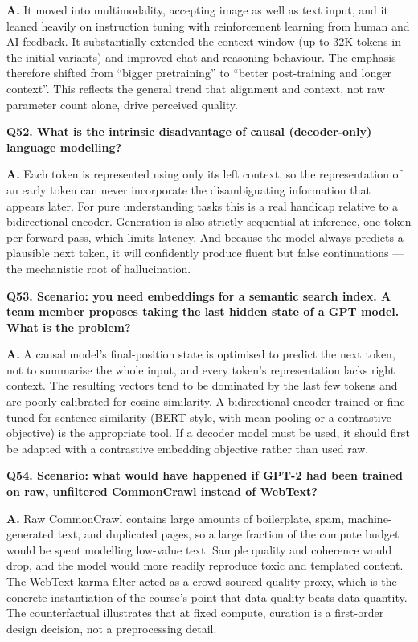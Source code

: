 \documentclass[11pt]{article}
\begin{document}
\noindent\textbf{A.} It moved into multimodality, accepting image as well as text input, and it leaned heavily on instruction tuning with reinforcement learning from human and AI feedback. It substantially extended the context window (up to 32K tokens in the initial variants) and improved chat and reasoning behaviour. The emphasis therefore shifted from ``bigger pretraining'' to ``better post-training and longer context''. This reflects the general trend that alignment and context, not raw parameter count alone, drive perceived quality.

\medskip
\noindent\textbf{Q52. What is the intrinsic disadvantage of causal (decoder-only) language modelling?}

\noindent\textbf{A.} Each token is represented using only its left context, so the representation of an early token can never incorporate the disambiguating information that appears later. For pure understanding tasks this is a real handicap relative to a bidirectional encoder. Generation is also strictly sequential at inference, one token per forward pass, which limits latency. And because the model always predicts a plausible next token, it will confidently produce fluent but false continuations --- the mechanistic root of hallucination.

\medskip
\noindent\textbf{Q53. Scenario: you need embeddings for a semantic search index. A team member proposes taking the last hidden state of a GPT model. What is the problem?}

\noindent\textbf{A.} A causal model's final-position state is optimised to predict the next token, not to summarise the whole input, and every token's representation lacks right context. The resulting vectors tend to be dominated by the last few tokens and are poorly calibrated for cosine similarity. A bidirectional encoder trained or fine-tuned for sentence similarity (BERT-style, with mean pooling or a contrastive objective) is the appropriate tool. If a decoder model must be used, it should first be adapted with a contrastive embedding objective rather than used raw.

\medskip
\noindent\textbf{Q54. Scenario: what would have happened if GPT-2 had been trained on raw, unfiltered CommonCrawl instead of WebText?}

\noindent\textbf{A.} Raw CommonCrawl contains large amounts of boilerplate, spam, machine-generated text, and duplicated pages, so a large fraction of the compute budget would be spent modelling low-value text. Sample quality and coherence would drop, and the model would more readily reproduce toxic and templated content. The WebText karma filter acted as a crowd-sourced quality proxy, which is the concrete instantiation of the course's point that data quality beats data quantity. The counterfactual illustrates that at fixed compute, curation is a first-order design decision, not a preprocessing detail.
\end{document}

